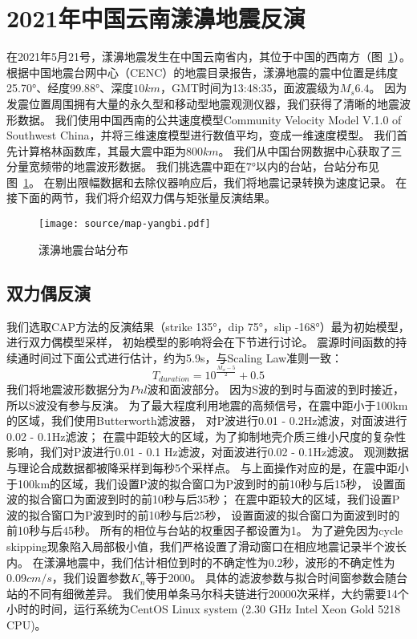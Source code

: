 \section{2021年中国云南漾濞地震反演}
在2021年5月21号，漾濞地震发生在中国云南省内，其位于中国的西南方（图~\ref{fig:map-yangbi}）。
根据中国地震台网中心（CENC）的地震目录报告，漾濞地震的震中位置是纬度25.70°、经度99.88°、深度$10km$，GMT时间为13:48:35，面波震级为$M_s 6.4$。
因为发震位置周围拥有大量的永久型和移动型地震观测仪器，我们获得了清晰的地震波形数据。
我们使用中国西南的公共速度模型Community Velocity Model V.1.0 of Southwest China\citep{Liu2021}，并将三维速度模型进行数值平均，变成一维速度模型。
我们首先计算格林函数库，其最大震中距为$800 km$。
我们从中国台网数据中心\citep{Zheng2009}获取了三分量宽频带的地震波形数据。
我们挑选震中距在7°以内的台站，台站分布见图~\ref{fig:map-yangbi}。
在剔出限幅数据和去除仪器响应后，我们将地震记录转换为速度记录。
在接下面的两节，我们将介绍双力偶与矩张量反演结果。


\begin{figure}[h]
    \centering
    \texttt{[image: source/map-yangbi.pdf]}
    \caption{漾濞地震台站分布}
    \label{fig:map-yangbi}
\end{figure}

\subsection{双力偶反演}

我们选取CAP方法的反演结果（strike 135°，dip 75°，slip -168°）最为初始模型，进行双力偶模型采样，
初始模型的影响将会在下节进行讨论。
震源时间函数的持续通时间过下面公式进行估计，约为5.9s，与Scaling Law\citep{Somerville1999}准则一致：
\begin{equation}
    T_{duration} = 10^{\frac{M_w-5}{2}}+0.5
    \label{equ:duration-time}
\end{equation}
我们将地震波形数据分为$Pnl$波和面波部分。
因为S波的到时与面波的到时接近，所以S波没有参与反演。
为了最大程度利用地震的高频信号，在震中距小于100km的区域，我们使用Butterworth滤波器，
对P波进行0.01 - 0.2Hz滤波，对面波进行0.02 - 0.1Hz滤波；
在震中距较大的区域，为了抑制地壳介质三维小尺度的复杂性影响，我们对P波进行0.01 - 0.1 Hz滤波，对面波进行0.02 - 0.1Hz滤波。
观测数据与理论合成数据都被降采样到每秒5个采样点。
与上面操作对应的是，在震中距小于100km的区域，我们设置P波的拟合窗口为P波到时的前10秒与后15秒，
设置面波的拟合窗口为面波到时的前10秒与后35秒；
在震中距较大的区域，我们设置P波的拟合窗口为P波到时的前10秒与后25秒，
设置面波的拟合窗口为面波到时的前10秒与后45秒。
所有的相位与台站的权重因子都设置为1。
为了避免因为cycle skipping现象陷入局部极小值，我们严格设置了滑动窗口在相应地震记录半个波长内。
在漾濞地震中，我们估计相位到时的不确定性为0.2秒，波形的不确定性为0.09$cm/s$，我们设置参数$K_n$等于2000。
具体的滤波参数与拟合时间窗参数会随台站的不同有细微差异。
我们使用单条马尔科夫链进行20000次采样，大约需要14个小时的时间，运行系统为CentOS Linux system (2.30 GHz Intel Xeon Gold 5218 CPU)。

